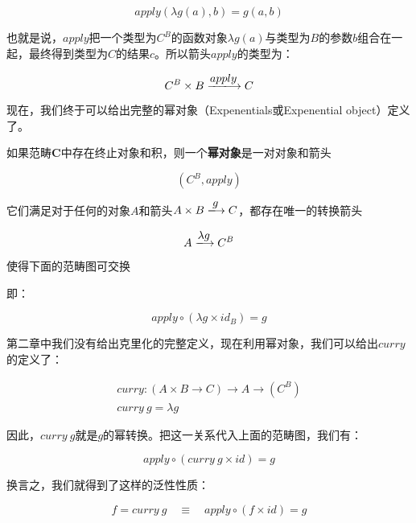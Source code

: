 \documentclass{article}
\begin{document}
\[
apply(\lambda g(a), b) = g(a, b)
\]

也就是说，$apply$把一个类型为$C^B$的函数对象$\lambda g(a)$与类型为$B$的参数$b$组合在一起，最终得到类型为$C$的结果$c$。所以箭头$apply$的类型为：

\[
C^B \times B \arrowto{apply} C
\]

现在，我们终于可以给出完整的幂对象（Expenentials或Expenential object）定义了。

\begin{definition}
如果范畴$\pmb{C}$中存在终止对象和积，则一个\textbf{幂对象}是一对对象和箭头

\[
(C^B, apply)
\]

它们满足对于任何的对象$A$和箭头$A \times B \arrowto{g} C$，都存在唯一的转换箭头

\[
 A \arrowto{\lambda g} C^B
\]

使得下面的范畴图可交换

\begin{center}
\end{center}

即：

\[
  apply \circ (\lambda g \times id_B) = g
\]

\end{definition}

第二章中我们没有给出克里化的完整定义，现在利用幂对象，我们可以给出$curry$的定义了：

\[
\begin{array}{l}
curry : (A \times B \to C) \to A \to (C^B) \\
curry\ g = \lambda g
\end{array}
\]

因此，$curry\ g$就是$g$的幂转换。把这一关系代入上面的范畴图，我们有：

\[
  apply \circ (curry\ g \times id) = g
\]

换言之，我们就得到了这样的泛性性质：

\[
  f = curry\ g \quad \equiv \quad apply \circ (f \times id) = g
\]
\end{document}
